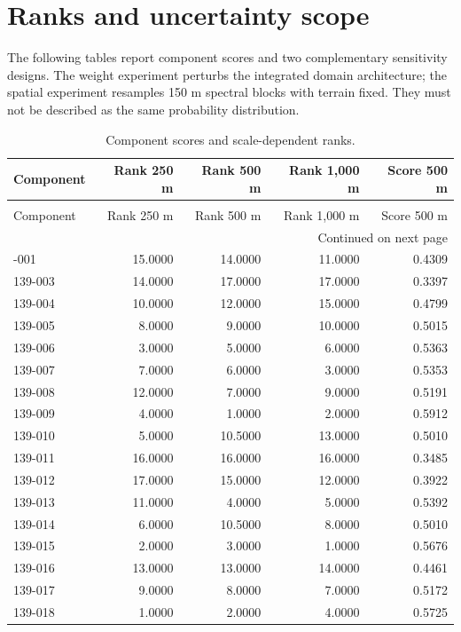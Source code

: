 \documentclass[10pt,a4paper]{article}
\begin{document}
\section{Ranks and uncertainty scope}
The following tables report component scores and two complementary sensitivity designs. The weight experiment perturbs the integrated domain architecture; the spatial experiment resamples 150 m spectral blocks with terrain fixed. They must not be described as the same probability distribution.

\begin{longtable}{lrrrr}
\caption{Component scores and scale-dependent ranks.} \\
\toprule
Component & Rank 250 m & Rank 500 m & Rank 1,000 m & Score 500 m \\
\midrule
\endfirsthead
\caption[]{Component scores and scale-dependent ranks.} \\
\toprule
Component & Rank 250 m & Rank 500 m & Rank 1,000 m & Score 500 m \\
\midrule
\endhead
\midrule
\multicolumn{5}{r}{Continued on next page} \\
\midrule
\endfoot
\bottomrule
\endlastfoot
139-001 & 15.0000 & 14.0000 & 11.0000 & 0.4309 \\
139-003 & 14.0000 & 17.0000 & 17.0000 & 0.3397 \\
139-004 & 10.0000 & 12.0000 & 15.0000 & 0.4799 \\
139-005 & 8.0000 & 9.0000 & 10.0000 & 0.5015 \\
139-006 & 3.0000 & 5.0000 & 6.0000 & 0.5363 \\
139-007 & 7.0000 & 6.0000 & 3.0000 & 0.5353 \\
139-008 & 12.0000 & 7.0000 & 9.0000 & 0.5191 \\
139-009 & 4.0000 & 1.0000 & 2.0000 & 0.5912 \\
139-010 & 5.0000 & 10.5000 & 13.0000 & 0.5010 \\
139-011 & 16.0000 & 16.0000 & 16.0000 & 0.3485 \\
139-012 & 17.0000 & 15.0000 & 12.0000 & 0.3922 \\
139-013 & 11.0000 & 4.0000 & 5.0000 & 0.5392 \\
139-014 & 6.0000 & 10.5000 & 8.0000 & 0.5010 \\
139-015 & 2.0000 & 3.0000 & 1.0000 & 0.5676 \\
139-016 & 13.0000 & 13.0000 & 14.0000 & 0.4461 \\
139-017 & 9.0000 & 8.0000 & 7.0000 & 0.5172 \\
139-018 & 1.0000 & 2.0000 & 4.0000 & 0.5725 \\
\end{longtable}
\end{document}
